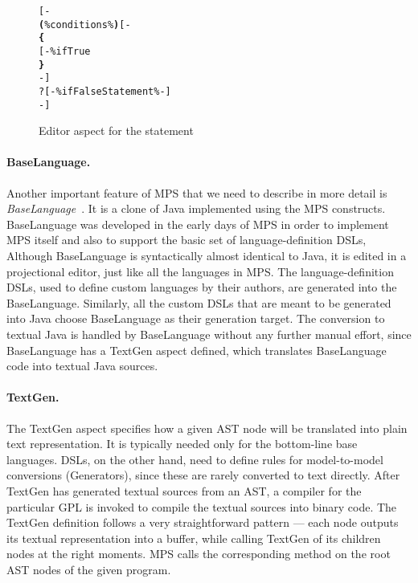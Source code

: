\begin{figure}[ht]
\centering
\begin{alltt}
\small
{}  
    [-
       \textbf{(} \% conditions \% \textbf{)} [-
      \textbf{\{}
      [- \% ifTrue % -]
      \textbf{\}}
    -]
    ?[-  \% ifFalseStatement \% -]
    -]
\end{alltt}
\caption{Editor aspect for the  statement}
\label{fig:if_editor_definition}
\end{figure}

\paragraph{BaseLanguage.}
Another important feature of MPS that we need to describe in more detail is \emph{BaseLanguage}~\cite{ref:BASELANG}.
It is a clone of Java implemented using the MPS constructs.
BaseLanguage was developed in the early days of MPS in order to implement MPS itself and also to support the basic set of language-definition DSLs,
Although BaseLanguage is syntactically almost identical to Java, it is edited in a projectional editor, just like all the languages in MPS.
The language-definition DSLs, used to define custom languages by their authors, are generated into the BaseLanguage.
Similarly, all the custom DSLs that are meant to be generated into Java choose BaseLanguage as their generation target.
The conversion to textual Java is handled by BaseLanguage without any further manual effort, since BaseLanguage has a TextGen aspect defined, which translates BaseLanguage code into textual Java sources.

\paragraph{TextGen.}
The TextGen aspect specifies how a given AST node will be translated into plain text representation.
It is typically needed only for the bottom-line base languages.
DSLs, on the other hand, need to define rules for model-to-model conversions (Generators), since these are rarely converted to text directly.
After TextGen has generated textual sources from an AST, a compiler for the particular GPL is invoked to compile the textual sources into binary code.
The TextGen definition follows a very straightforward pattern --- each node outputs its textual representation into a buffer, while calling TextGen of its children nodes at the right moments.
MPS calls the corresponding method on the root AST nodes of the given program.


